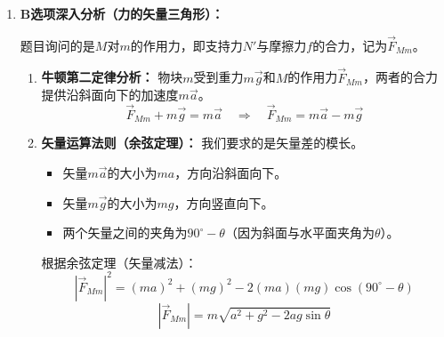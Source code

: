 \documentclass[CJKmath,a4paper,10pt]{exam-zh}
\begin{document}
\begin{liti}
\begin{enumerate}
\begin{enumerate}
    \item \textbf{受力分析：} 把斜面$M$和物块$m$看作一个整体。系统在竖直方向收到向下的总重力 $(M+m)g$ 和向上的支持力 $N$。
    \item \textbf{加速度分析：}
    \begin{itemize}
        \item 斜面$M$静止，竖直加速度为 $0$。
        \item 物块$m$沿斜面加速下滑，加速度大小为 $a$。其竖直向下的分量为 $a_y = a\sin\theta$。
    \end{itemize}
    \item \textbf{列牛顿第二定律方程（竖直方向，向下为正）：}
    \[ (M+m)g - N = M \cdot 0 + m \cdot (a\sin\theta) \]
    \item \textbf{求解支持力：}
    \[ N = (M+m)g - m a \sin\theta \]
\end{enumerate}

\textbf{结论：}由于 $m, a, \sin\theta$ 均为正值，故支持力 $N < (M+m)g$。说明系统处于\textit{失重}状态（整体质心有向下的加速度），A选项错误。

\item 
\textbf{B选项深入分析（力的矢量三角形）：}

题目询问的是$M$对$m$的作用力，即支持力$N'$与摩擦力$f$的合力，记为$\vec{F}_{Mm}$。

\begin{enumerate}
    \item \textbf{牛顿第二定律分析：} 物块$m$受到重力$m\vec{g}$和$M$的作用力$\vec{F}_{Mm}$，两者的合力提供沿斜面向下的加速度$m\vec{a}$。
    \[ \vec{F}_{Mm} + m\vec{g} = m\vec{a} \quad \Rightarrow \quad \vec{F}_{Mm} = m\vec{a} - m\vec{g} \]
    \item \textbf{矢量运算法则（余弦定理）：}
    我们要求的是矢量差的模长。
    \begin{itemize}
        \item 矢量$m\vec{a}$的大小为$ma$，方向沿斜面向下。
        \item 矢量$m\vec{g}$的大小为$mg$，方向竖直向下。
        \item 两个矢量之间的夹角为$90^\circ - \theta$（因为斜面与水平面夹角为$\theta$）。
    \end{itemize}
    根据余弦定理（矢量减法）：
    \[ |\vec{F}_{Mm}|^2 = (ma)^2 + (mg)^2 - 2(ma)(mg)\cos(90^\circ - \theta) \]
    \[ |\vec{F}_{Mm}| = m\sqrt{a^2 + g^2 - 2ag\sin\theta} \]
\end{enumerate}


\end{enumerate}
\end{liti}
\end{document}
